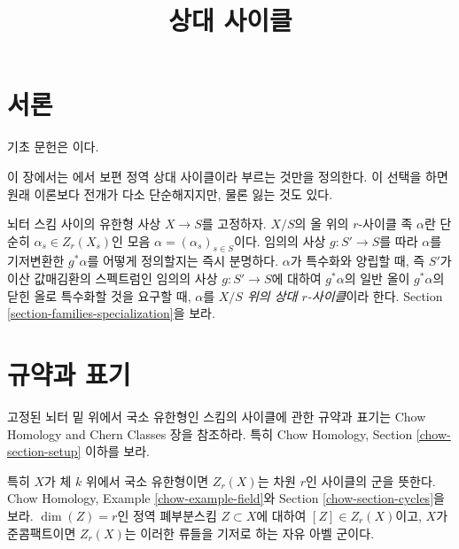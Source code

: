 

%


\title{상대 사이클}

\maketitle

\label{section-phantom}

\tableofcontents



\section{서론}
\label{section-introduction}

\noindent
기초 문헌은 \cite{SV}이다.

\medskip\noindent
이 장에서는 \cite{SV}에서 보편 정역 상대 사이클이라 부르는 것만을
정의한다. 이 선택을 하면 원래 이론보다 전개가 다소 단순해지지만,
물론 잃는 것도 있다.

\medskip\noindent
뇌터 스킴 사이의 유한형 사상 $X \to S$를 고정하자. $X/S$의
올 위의 $r$-사이클 족 $\alpha$란 단순히
$\alpha_s \in Z_r(X_s)$인 모음
$\alpha = (\alpha_s)_{s \in S}$이다. 임의의 사상
$g : S' \to S$를 따라 $\alpha$를 기저변환한 $g^*\alpha$를
어떻게 정의할지는 즉시 분명하다. $\alpha$가 특수화와 양립할 때,
즉 $S'$가 이산 값매김환의 스펙트럼인 임의의 사상
$g : S' \to S$에 대하여 $g^*\alpha$의 일반 올이
$g^*\alpha$의 닫힌 올로 특수화할 것을 요구할 때,
$\alpha$를 {\it $X/S$ 위의 상대 $r$-사이클}이라 한다.
Section \ref{section-families-specialization}을 보라.




\section{규약과 표기}
\label{section-conventions}

\noindent
고정된 뇌터 밑 위에서 국소 유한형인 스킴의 사이클에 관한
규약과 표기는 Chow Homology and Chern Classes 장을 참조하라.
특히 Chow Homology, Section \ref{chow-section-setup} 이하를 보라.

\medskip\noindent
특히 $X$가 체 $k$ 위에서 국소 유한형이면 $Z_r(X)$는 차원
$r$인 사이클의 군을 뜻한다. Chow Homology, Example
\ref{chow-example-field}와 Section \ref{chow-section-cycles}을 보라.
$\dim(Z) = r$인 정역 폐부분스킴 $Z \subset X$에 대하여
$[Z] \in Z_r(X)$이고, $X$가 준콤팩트이면 $Z_r(X)$는 이러한
류들을 기저로 하는 자유 아벨 군이다.



